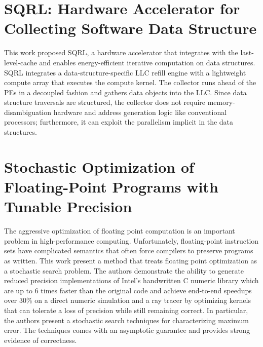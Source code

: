 \section{SQRL: Hardware Accelerator for Collecting Software Data Structure}
This work \cite{kumar2014sqrl} proposed SQRL, a hardware accelerator that integrates with the
last-level-cache and enables energy-efficient iterative computation on data
structures. SQRL integrates a data-structure-specific LLC refill engine with a
lightweight compute array that executes the compute kernel. The collector runs
ahead of the PEs in a decoupled fashion and gathers data objects into the LLC.
Since data structure traversals are structured, the collector does not require
memory-disambiguation hardware and address generation logic like conventional
processors; furthermore, it can exploit the parallelism implicit in the data
structures.

\section{Stochastic Optimization of Floating-Point Programs with Tunable
Precision}
The aggressive optimization \cite{schkufza2014stochastic} of floating point computation is an important
problem in high-performance computing. Unfortunately, floating-point instruction
sets have complicated semantics that often force compilers to preserve programs
as written. This work present a method that treats floating point optimization
as a stochastic search problem. The authors demonstrate the ability to generate
reduced precision implementations of Intel's handwritten C numeric library which
are up to 6 times faster than the original code and achieve end-to-end speedups
over 30\% on a direct numeric simulation and a ray tracer by optimizing kernels
that can tolerate a loss of precision while still remaining correct. In
particular, the authors present a stochastic search techniques for
characterizing maximum error. The techniques comes with an asymptotic guarantee
and provides strong evidence of correctness.


